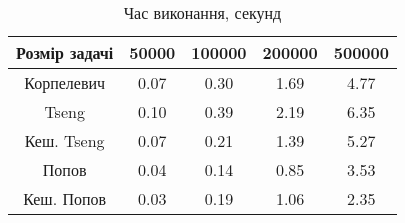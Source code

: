 \begin{table}[H]
	\centering
	\begin{tabular}{|c||c|c|c|c|}\hline
		Розмір задачі & 50000 & 100000 & 200000 & 500000 \\ \hline \hline
		Корпелевич & 0.07 & 0.30 & 1.69 & 4.77 \\ \hline
		Tseng & 0.10 & 0.39 & 2.19 & 6.35 \\ \hline
		Кеш. Tseng & 0.07 & 0.21 & 1.39 & 5.27 \\ \hline
		Попов & 0.04 & 0.14 & 0.85 & 3.53 \\ \hline
		Кеш. Попов & 0.03 & 0.19 & 1.06 & 2.35 \\ \hline
	\end{tabular}
	\caption{Час виконання, секунд}
\end{table}
